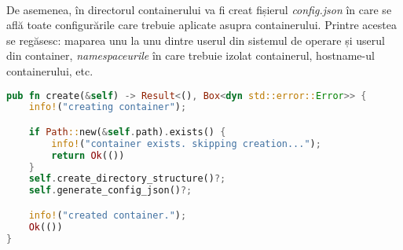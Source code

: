             \paragraph{} De asemenea, în directorul containerului va fi creat fișierul \textit{config.json} în care se află toate configurările care trebuie aplicate asupra containerului. Printre acestea se regăsesc: maparea unu la unu dintre userul din sistemul de operare și userul din container, \textit{namespaceurile} în care trebuie izolat containerul, hostname-ul containerului, etc.
                \begin{lstlisting}[language=Rust, style=boxed, caption={Crearea unui container},captionpos=b]
pub fn create(&self) -> Result<(), Box<dyn std::error::Error>> {
    info!("creating container");

    if Path::new(&self.path).exists() {
        info!("container exists. skipping creation...");
        return Ok(())
    }
    self.create_directory_structure()?;
    self.generate_config_json()?;

    info!("created container.");
    Ok(())
}               \end{lstlisting}
                \label{fig:cod_ccreate}
